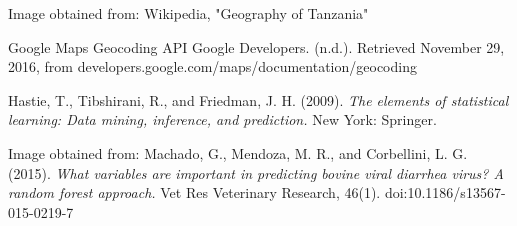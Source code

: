 \documentclass[10pt]{SelfArx} %
\begin{document}
%
%

\begin{thebibliography}{9}


 
\bibitem{} 
Image obtained from: Wikipedia, "Geography of Tanzania"

\bibitem{}
Google Maps Geocoding API
Google Developers. (n.d.). Retrieved November 29, 2016, from developers.google.com/maps/documentation/geocoding

\bibitem{}
Hastie, T., Tibshirani, R., and Friedman, J. H. (2009).
\textit{The elements of statistical learning: Data mining, inference, and prediction.}
 New York: Springer.

\bibitem{}
Image obtained from: Machado, G., Mendoza, M. R., and Corbellini, L. G. (2015).
\textit{What variables are important in predicting bovine viral diarrhea virus? A random forest approach.}
 Vet Res Veterinary Research, 46(1). doi:10.1186/s13567-015-0219-7




\end{thebibliography}
\end{document}
